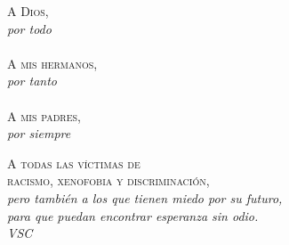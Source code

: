 \pagestyle{empty}

\begin{flushright}
\textsc{A Dios,} \hspace{1cm} ${}$\\
\textit{por todo}\\
\textit{ }\\
\textsc{A mis hermanos,} \hspace{1.2cm} ${}$\\
\textit{por tanto}\\
\textit{ }\\
\textsc{A mis padres,} \hspace{1.6cm} ${}$\\
\textit{por siempre}\\
\textit{ }
\end{flushright}
\vspace{6cm}
\begin{center}
\textsc{A todas las víctimas de}\\
\textsc{racismo, xenofobia y discriminación,}\\
\textit{pero también a los que tienen miedo por su futuro,}\\
\textit{para que puedan encontrar esperanza sin odio.}\\
\vspace{0.5cm}
\textit{VSC}
\end{center}